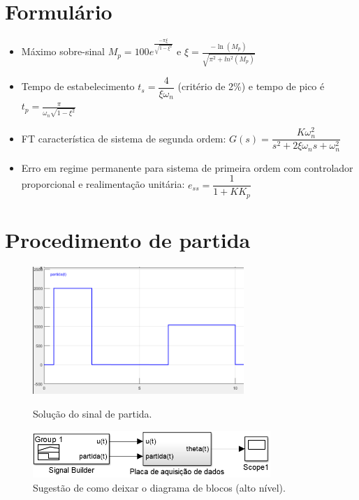 \documentclass[a4paper,12pt]{exam}
\begin{document}
\section*{Formulário}

\begin{itemize}
    \item Máximo sobre-sinal $M_p = 100 e^{\frac{-\pi \xi}{\sqrt{1 - \xi^2}}}$ e $\xi = \frac{-\ln(M_p)}{\sqrt{\pi^2 + ln^2(M_p)}}$
    
    \item Tempo de estabelecimento $t_s = \dfrac{4}{\xi \omega_n}$ (critério de 2\%) e tempo de pico é $t_p = \frac{\pi}{\omega_n \sqrt{1 - \xi^2}}$
    
    \item FT característica de sistema de segunda ordem: $G(s) = \dfrac{K \omega_n^2}{s^2 + 2 \xi \omega_n s + \omega_n^2}$
    
    \item Erro em regime permanente para sistema de primeira ordem com controlador proporcional e realimentação unitária: $e_{ss} = \dfrac{1}{1 + K K_p}$
\end{itemize}


\newpage

\section{Procedimento de partida}

\begin{figure}
    \centering
    \vspace*{5mm}
    \includegraphics[width=8cm]{figs/sinal_partida.png}
    \caption{Solução do sinal de partida.}
    \label{fig:solucao-sinal-partida}
    
    \vspace*{5mm}
    \includegraphics[width=9cm]{figs/simulink_signal_builder.png}
    \caption{Sugestão de como deixar o diagrama de blocos (alto nível).}
    \label{fig:sugestao-diagrama-blocos-inicial}
    
\end{figure}
\end{document}
